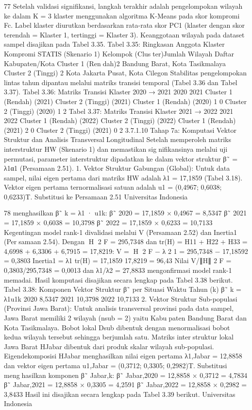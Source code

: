 77
Setelah validasi signifikansi, langkah terakhir adalah pengelompokan wilayah ke
dalam K = 3 klaster menggunakan algoritma K-Means pada skor kompromi Fc. Label
klaster diurutkan berdasarkan rata-rata skor PC1 (klaster dengan skor terendah = Klaster 1,
tertinggi = Klaster 3). Keanggotaan wilayah pada dataset sampel disajikan pada Tabel 3.35.
Tabel 3.35: Ringkasan Anggota Klaster Kompromi STATIS (Skenario 1)
Kelompok (Cluster)Jumlah Wilayah Daftar Kabupaten/Kota
Cluster 1 (Rendah)2 Bandung Barat, Kota Tasikmalaya
Cluster 2 (Tinggi) 2 Kota Jakarta Pusat, Kota Cilegon
Stabilitas pengelompokan lintas tahun dipantau melalui matriks transisi temporal
(Tabel 3.36 dan Tabel 3.37).
Tabel 3.36: Matriks Transisi Klaster 2020 → 2021
2020
2021 Cluster 1 (Rendah) (2021) Cluster 2 (Tinggi) (2021)
Cluster 1 (Rendah) (2020) 1 0
Cluster 2 (Tinggi) (2020) 1 2
Tabel 3.37: Matriks Transisi Klaster 2021 → 2022
2021
2022 Cluster 1 (Rendah) (2022) Cluster 2 (Tinggi) (2022)
Cluster 1 (Rendah) (2021) 2 0
Cluster 2 (Tinggi) (2021) 0 2
3.7.1.10 Tahap 7a: Komputasi Vektor Struktur dan Analisis TransversalLongitudinal
Setelah memperoleh matriks interstruktur HW (Skenario 1) dan memastikan signifikansinya melalui uji permutasi, parameter interstruktur dipadatkan ke dalam vektor
struktur β˜ = λ1α1 (Persamaan 2.51).
1. Vektor Struktur Gabungan (Global): Untuk data sampel, nilai eigen pertama dari
matriks HW adalah λ1 = 17,1859 (Tabel 3.18). Vektor eigen pertama ternormalisasi
satuan adalah u1 = (0,4967; 0,6038; 0,6233)T. Substitusi ke Persamaan 2.51
Universitas Indonesia

78
menghasilkan β˜
k = λ1 · u1k:
β˜
2020 = 17,1859 × 0,4967 = 8,5347
β˜
2021 = 17,1859 × 0,6038 = 10,3798
β˜
2022 = 17,1859 × 0,6233 = 10,7133
Kegentingan model rank-1 divalidasi melalui V (Persamaan 2.52) dan Inertia1 (Persamaan 2.54). Dengan ∥H∥
2
F = 295,7348 dan tr(H) = H11 + H22 + H33 =
4,6998 + 6,3306 + 6,7915 = 17,8219:
V = ∥H∥
2
F − λ
2
1 = 295,7348 − 17,18592 = 0,3803
Inertia1 =
λ1
tr(H)
=
17,1859
17,8219
= 96,43%
Nilai V/∥H∥
2
F = 0,3803/295,7348 = 0,0013 dan λ1/λ2 = 27,8833 mengonfirmasi
model rank-1 memadai. Hasil komputasi disajikan secara lengkap pada Tabel 3.38
berikut.
Tabel 3.38: Komponen Vektor Struktur β˜ per Situasi Waktu
Tahun (k) β˜
k = λ1u1k
2020 8,5347
2021 10,3798
2022 10,7133
2. Vektor Struktur Sub-populasi (Provinsi Jawa Barat): Untuk analisis transversal
provinsi pada data sampel, Jawa Barat memiliki 2 wilayah (nsub = 2) yaitu Kabupaten Bandung Barat dan Kota Tasikmalaya. Bobot lokal Dsub dibentuk dengan
menormalisasi bobot kedua wilayah tersebut sehingga berjumlah satu. Matriks interstruktur lokal Jawa Barat HJabar dibentuk dari produk skalar wilayah sub-populasi.
Eigendekomposisi HJabar menghasilkan nilai eigen pertama λ1,Jabar = 12,8858 dan
vektor eigen pertama u1,Jabar = (0,3712; 0,3305; 0,2982)T. Substitusi menghasilkan komponen β˜
Jabar,k:
β˜
Jabar,2020 = 12,8858 × 0,3712 = 4,7834
β˜
Jabar,2021 = 12,8858 × 0,3305 = 4,2591
β˜
Jabar,2022 = 12,8858 × 0,2982 = 3,8433
Hasil ini disajikan secara lengkap pada Tabel 3.39 berikut.
Universitas Indonesia

